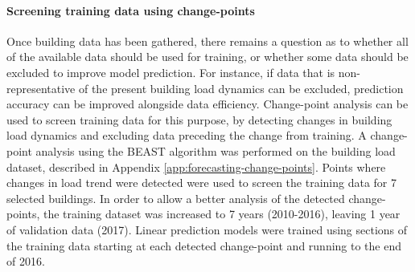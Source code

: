 \paragraph{Screening training data using change-points} \label{sec:forecasting-data-efficiency-change-point}


Once building data has been gathered, there remains a question as to whether all of the available data should be used for training, or whether some data should be excluded to improve model prediction. For instance, if data that is non-representative of the present building load dynamics can be excluded, prediction accuracy can be improved alongside data efficiency.
Change-point analysis can be used to screen training data for this purpose, by detecting changes in building load dynamics and excluding data preceding the change from training. A change-point analysis using the BEAST algorithm \citep{zhao2019DetectingChangepointTrend} was performed on the building load dataset, described in Appendix \ref{app:forecasting-change-points}. Points where changes in load trend were detected were used to screen the training data for 7 selected buildings. In order to allow a better analysis of the detected change-points, the training dataset was increased to 7 years (2010-2016), leaving 1 year of validation data (2017). Linear prediction models were trained using sections of the training data starting at each detected change-point and running to the end of 2016.

